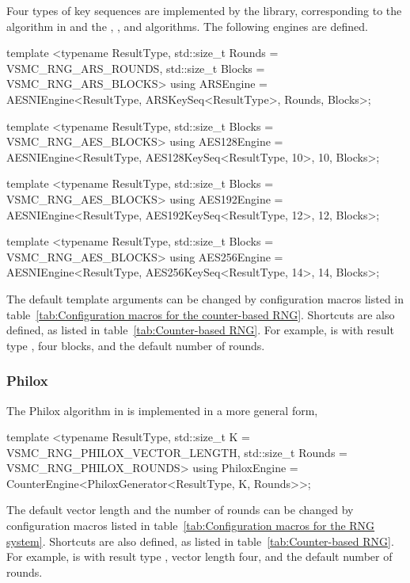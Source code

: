 Four types of key sequences are implemented by the library, corresponding to
the \ars algorithm in \textcite{Salmon:2011um} and the , , and
 algorithms. The following \rng engines are defined.
\begin{cppcode}
  template <typename ResultType, std::size_t Rounds = VSMC_RNG_ARS_ROUNDS,
  std::size_t Blocks = VSMC_RNG_ARS_BLOCKS>
  using ARSEngine =
  AESNIEngine<ResultType, ARSKeySeq<ResultType>, Rounds, Blocks>;

  template <typename ResultType, std::size_t Blocks = VSMC_RNG_AES_BLOCKS>
  using AES128Engine =
  AESNIEngine<ResultType, AES128KeySeq<ResultType, 10>, 10, Blocks>;

  template <typename ResultType, std::size_t Blocks = VSMC_RNG_AES_BLOCKS>
  using AES192Engine =
  AESNIEngine<ResultType, AES192KeySeq<ResultType, 12>, 12, Blocks>;

  template <typename ResultType, std::size_t Blocks = VSMC_RNG_AES_BLOCKS>
  using AES256Engine =
  AESNIEngine<ResultType, AES256KeySeq<ResultType, 14>, 14, Blocks>;
\end{cppcode}
The default template arguments can be changed by configuration macros listed in
table~\ref{tab:Configuration macros for the counter-based RNG}. Shortcuts are
also defined, as listed in table~\ref{tab:Counter-based RNG}. For example,
 is  with result type
, four blocks, and the default number of rounds.

\subsubsection{Philox}
\label{ssub:Philox}

The Philox algorithm in \textcite{Salmon:2011um} is implemented in a more
general form,
\begin{cppcode}
  template <typename ResultType, std::size_t K = VSMC_RNG_PHILOX_VECTOR_LENGTH,
  std::size_t Rounds = VSMC_RNG_PHILOX_ROUNDS>
  using PhiloxEngine = CounterEngine<PhiloxGenerator<ResultType, K, Rounds>>;
\end{cppcode}
The default vector length and the number of rounds can be changed by
configuration macros listed in table~\ref{tab:Configuration macros for the RNG
  system}. Shortcuts are also defined, as listed in
table~\ref{tab:Counter-based RNG}. For example,  is
 with result type , vector
length four, and the default number of rounds.

